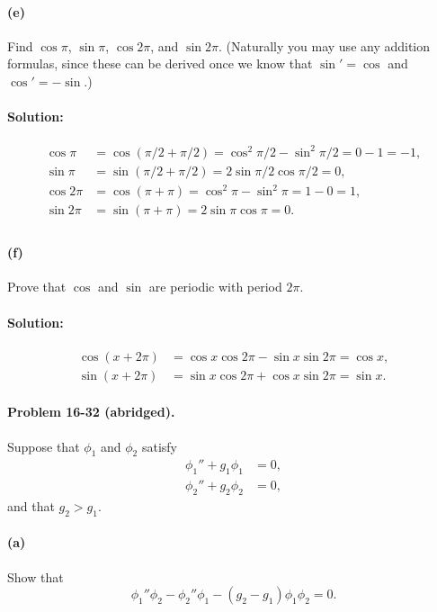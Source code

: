 \documentclass{article}
\begin{document}
\paragraph{(e)} Find $\cos \pi$, $\sin \pi$, $\cos 2\pi$, and $\sin 2\pi$.
(Naturally you may use any addition formulas, since these can be derived once
we know that $\sin' = \cos$ and $\cos' = -\sin$.)

\paragraph{Solution:} \begin{align*}
  \cos \pi &= \cos(\pi/2 + \pi/2) = \cos^2 \pi/2 - \sin^2 \pi/2 = 0 - 1 = -1,
  \\
  \sin \pi &= \sin(\pi/2 + \pi/2) = 2\sin \pi/2 \cos \pi/2 = 0, \\
  \cos 2\pi &= \cos(\pi + \pi) = \cos^2 \pi - \sin^2 \pi = 1 - 0 = 1, \\
  \sin 2\pi &= \sin(\pi + \pi) = 2\sin \pi \cos \pi = 0. \\
\end{align*}

\paragraph{(f)} Prove that $\cos$ and $\sin$ are periodic with period $2\pi$.

\paragraph{Solution:} \begin{align*}
  \cos(x + 2\pi) &= \cos x \cos 2\pi - \sin x \sin 2\pi = \cos x, \\
  \sin(x + 2\pi) &= \sin x \cos 2\pi + \cos x \sin 2\pi = \sin x.
\end{align*}

\paragraph{Problem 16-32 (abridged).} Suppose that $\phi_1$ and $\phi_2$
satisfy \begin{align*}
  \phi_1'' + g_1\phi_1 &= 0, \\
  \phi_2'' + g_2\phi_2 &= 0,
\end{align*} and that $g_2 > g_1$.

\paragraph{(a)} Show that \begin{equation*}
  \phi_1''\phi_2 - \phi_2''\phi_1 - (g_2 - g_1)\phi_1\phi_2 = 0.
\end{equation*}
\end{document}
